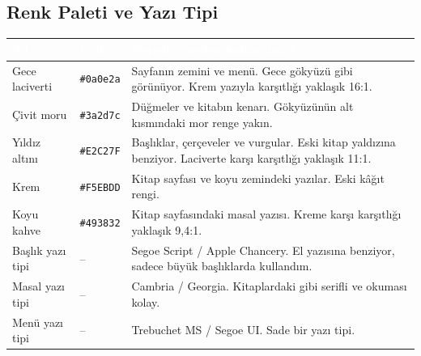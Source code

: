 \documentclass[12pt,a4paper]{article}
\begin{document}
\subsection{Renk Paleti ve Yazı Tipi}
\begin{center}
\begin{tabular}{@{}llp{6.4cm}@{}}
\toprule
\rowcolor{ana}\textcolor{white}{\textbf{Ad}} & \textcolor{white}{\textbf{Kod}} & \textcolor{white}{\textbf{Nerede / neden kullandınız?}} \\
\midrule
Gece laciverti & \texttt{\#0a0e2a} & Sayfanın zemini ve menü. Gece gökyüzü gibi görünüyor. Krem yazıyla karşıtlığı yaklaşık 16:1. \\
Çivit moru & \texttt{\#3a2d7c} & Düğmeler ve kitabın kenarı. Gökyüzünün alt kısmındaki mor renge yakın. \\
Yıldız altını & \texttt{\#E2C27F} & Başlıklar, çerçeveler ve vurgular. Eski kitap yaldızına benziyor. Laciverte karşı karşıtlığı yaklaşık 11:1. \\
Krem & \texttt{\#F5EBDD} & Kitap sayfası ve koyu zemindeki yazılar. Eski kâğıt rengi. \\
Koyu kahve & \texttt{\#493832} & Kitap sayfasındaki masal yazısı. Kreme karşı karşıtlığı yaklaşık 9,4:1. \\
Başlık yazı tipi & -- & Segoe Script / Apple Chancery. El yazısına benziyor, sadece büyük başlıklarda kullandım. \\
Masal yazı tipi & -- & Cambria / Georgia. Kitaplardaki gibi serifli ve okuması kolay. \\
Menü yazı tipi & -- & Trebuchet MS / Segoe UI. Sade bir yazı tipi. \\
\bottomrule
\end{tabular}
\end{center}
\end{document}
